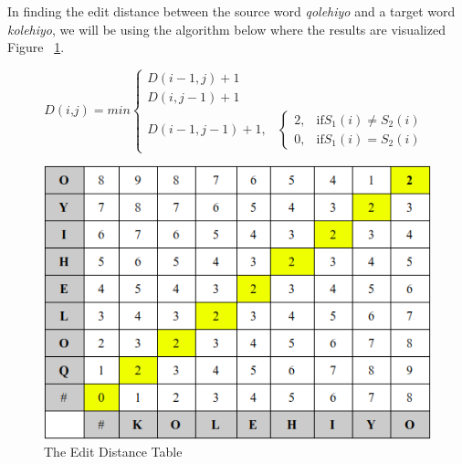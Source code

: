\documentclass[12pt]{book}
\begin{document}
In finding the edit distance between the source word \textit{qolehiyo} and a target word \textit{kolehiyo}, we will be using the algorithm below where the results are visualized Figure ~\ref{editdistancetable}.

\[
   D(\textit{i,j})= min
\begin{cases}
   D(i-1,j)+1\\
   D(i,j-1)+1\\
   D(i-1,j-1)+1,              & \begin{cases}
   2, & \text{if} S_{1}(i) \neq S_{2}(i)\\
   0, & \text{if} S_{1}(i) = S_{2}(i)
\end{cases}
\end{cases}
\]

\begin{figure}[H]
  \centering
          \includegraphics[scale=.60]{editdistancetable}
          \caption{The Edit Distance Table}
          \label{editdistancetable}
\end{figure}
\end{document}
